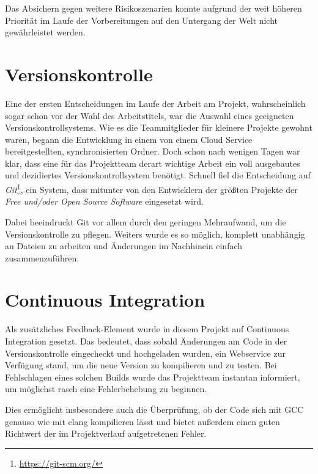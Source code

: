 Das Absichern gegen weitere Risikoszenarien konnte aufgrund der weit höheren Priorität im Laufe der Vorbereitungen auf den Untergang der Welt nicht gewährleistet werden.

\section{Versionskontrolle}
Eine der ersten Entscheidungen im Laufe der Arbeit am Projekt, wahrscheinlich sogar schon vor der Wahl des Arbeitstitels, war die Auswahl eines geeigneten Versionskontrollsystems. Wie es die Teammitglieder für kleinere Projekte gewohnt waren, begann die Entwicklung in einem von einem Cloud Service bereitgestellten, synchronisierten Ordner. Doch schon nach wenigen Tagen war klar, dass eine für das Projektteam derart wichtige Arbeit ein voll ausgebautes und dezidiertes Versionskontrollsystem benötigt. Schnell fiel die Entscheidung auf \textit{Git}\footnote{\url{https://git-scm.org/}}, ein System, dass mitunter von den Entwicklern der größten Projekte der \textit{Free und/oder Open Source Software} eingesetzt wird.

Dabei beeindruckt Git vor allem durch den geringen Mehraufwand, um die Versionskontrolle zu pflegen. Weiters wurde es so möglich, komplett unabhängig an Dateien zu arbeiten und Änderungen im Nachhinein einfach zusammenzuführen.

\section{Continuous Integration}
Als zusätzliches Feedback-Element wurde in diesem Projekt auf Continuous Integration ge\-setzt. Das bedeutet, dass sobald Änderungen am Code in der Versionskontrolle eingecheckt und hochgeladen wurden, ein Webservice zur Verfügung stand, um die neue Version zu kompilieren und zu testen. Bei Fehlschlagen eines solchen Builds wurde das Projektteam instantan informiert, um möglichst rasch eine Fehlerbehebung zu beginnen.

Dies ermöglicht insbesondere auch die Überprüfung, ob der Code sich mit GCC genauso wie mit clang kompilieren lässt und bietet außerdem einen guten Richtwert der im Projektverlauf aufgetretenen Fehler. 
